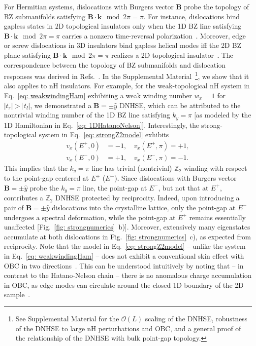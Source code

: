 \documentclass[aps,prl,twocolumn,amsmath,amssymb,floatfix,superscriptaddress]{revtex4-2}
\newcommand{\bs}[1]{\boldsymbol{#1}}
\begin{document}
For Hermitian systems, dislocations with Burgers vector $\bs{B}$ probe the topology of BZ submanifolds satisfying $\bs{B} \cdot \bs{k} \mod 2\pi= \pi$. For instance, dislocations bind gapless states in 2D topological insulators only when the 1D BZ line satisfying $\bs{B} \cdot \bs{k} \mod 2\pi= \pi$ carries a nonzero time-reversal polarization~\cite{Zaanen12,z2spinpumpfukane}. Moreover, edge or screw dislocations in 3D insulators bind gapless helical modes iff the 2D BZ plane satisfying $\bs{B} \cdot \bs{k} \mod 2\pi= \pi$ realizes a 2D topological insulator~\cite{AshvinScrewTI}. The correspondence between the topology of BZ submanifolds and dislocation responses was derived in Refs.~. In the Supplemental Material~\footnote{See Supplemental Material for the $\mathcal{O}(L)$ scaling of the DNHSE, robustness of the DNHSE to large nH perturbations and OBC, and a general proof of the relationship of the DNHSE with bulk point-gap topology.}, we show that it also applies to nH insulators. For example, for the weak-topological nH system in Eq.~\eqref{eq: weakwindingHam} exhibiting a weak winding number $w_x  = 1$ for $|t_r| > |t_l|$, we demonstrated a $\bs{B} = \pm\hat{y}$ DNHSE, which can be attributed to the nontrivial winding number of the 1D BZ line satisfying $k_y = \pi$ [as modeled by the 1D Hamiltonian in Eq.~\eqref{eq: 1DHatanoNelson}]. Interestingly, the strong-topological system in Eq.~\eqref{eq: strongZ2model} exhibits
\begin{equation}
\begin{aligned}
v_x (E^+,0) &= -1, \quad v_x (E^+,\pi) = +1,\\  v_x (E^-,0) &= +1, \quad v_x (E^-,\pi) = -1.
\end{aligned}
\end{equation}
This implies that the $k_y = \pi$ line has trivial (nontrivial) $\mathbb{Z}_2$ winding with respect to the point-gap centered at $E^+$ ($E^-$). Since dislocations with Burgers vector $\bs{B} = \pm \hat{y}$ probe the $k_y = \pi$ line, the point-gap at $E^-$, but not that at $E^+$, contributes a $\mathbb{Z}_2$ DNHSE protected by reciprocity. Indeed, upon introducing a pair of $\bs{B} = \pm \hat{y}$ dislocations into the crystalline lattice, only the point-gap at $E^-$ undergoes a spectral deformation, while the point-gap at $E^+$ remains essentially unaffected [Fig.~\ref{fig: strongnumerics}~b)]. Moreover, extensively many eigenstates accumulate at both dislocations in Fig.~\ref{fig: strongnumerics}~c), as expected from reciprocity. Note that the model in Eq.~\eqref{eq: strongZ2model} -- unlike the system in Eq.~\eqref{eq: weakwindingHam} -- does not exhibit a conventional skin effect with OBC in two directions~\cite{TopoSkin20}. This can be understood intuitively by noting that -- in contrast to the Hatano-Nelson chain -- there is no anomalous charge accumulation in OBC, as edge modes can circulate around the closed 1D boundary of the 2D sample~\cite{TopoSkin20,okuma2020,Kawabata20HOskin,okuma2021}.
\end{document}

